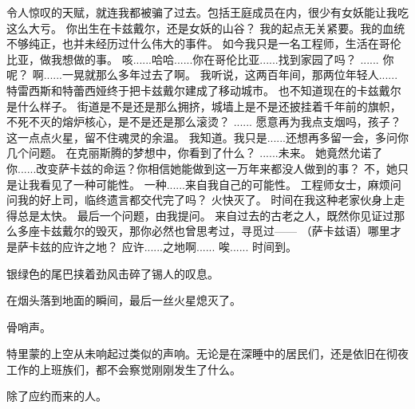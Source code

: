 \documentclass[openany]{book}
\begin{document}
\begin{dialogue}
     令人惊叹的天赋，就连我都被骗了过去。包括王庭成员在内，很少有女妖能让我吃这么大亏。
     你出生在卡兹戴尔，还是女妖的山谷？
     我的起点无关紧要。我的血统不够纯正，也并未经历过什么伟大的事件。
     如今我只是一名工程师，生活在哥伦比亚，做我想做的事。
     咳......哈哈......你在哥伦比亚......找到家园了吗？
     ......
     你呢？
     啊......一晃就那么多年过去了啊。
     我听说，这两百年间，那两位年轻人......特雷西斯和特蕾西娅终于把卡兹戴尔建成了移动城市。
     也不知道现在的卡兹戴尔是什么样子。
     街道是不是还是那么拥挤，城墙上是不是还披挂着千年前的旗帜，不死不灭的熔炉核心，是不是还是那么滚烫？
     ......
     愿意再为我点支烟吗，孩子？
     这一点点火星，留不住魂灵的余温。
     我知道。我只是......还想再多留一会，多问你几个问题。
     在克丽斯腾的梦想中，你看到了什么？
     ......未来。
     她竟然允诺了你......改变萨卡兹的命运？你相信她能做到这一万年来都没人做到的事？
     不，她只是让我看见了一种可能性。
     一种......来自我自己的可能性。
     工程师女士，麻烦问问我的好上司，临终遗言都交代完了吗？
     火快灭了。
     时间在我这种老家伙身上走得总是太快。
     最后一个问题，由我提问。
     来自过去的古老之人，既然你见证过那么多座卡兹戴尔的毁灭，那你必然也曾思考过，寻觅过——
     （萨卡兹语）哪里才是萨卡兹的应许之地？
     应许......之地啊......
     唉......
     时间到。
\end{dialogue}\par

银绿色的尾巴挟着劲风击碎了锡人的叹息。\par
在烟头落到地面的瞬间，最后一丝火星熄灭了。\par


骨哨声。\par
特里蒙的上空从未响起过类似的声响。无论是在深睡中的居民们，还是依旧在彻夜工作的上班族们，都不会察觉刚刚发生了什么。\par
除了应约而来的人。
\end{document}

